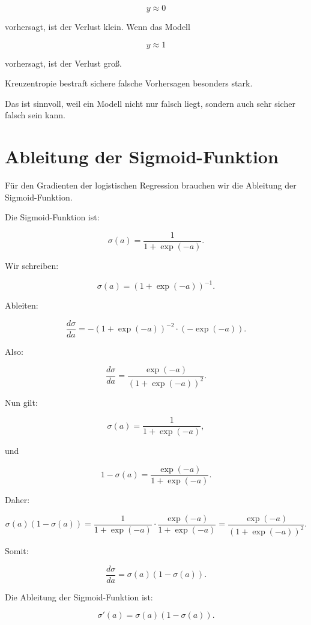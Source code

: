 \[
    y\approx 0
\]

vorhersagt, ist der Verlust klein.
Wenn das Modell

\[
    y\approx 1
\]

vorhersagt, ist der Verlust groß.

\begin{conceptbox}
Kreuzentropie bestraft sichere falsche Vorhersagen besonders stark.

Das ist sinnvoll, weil ein Modell nicht nur falsch liegt, sondern auch sehr sicher falsch sein kann.
\end{conceptbox}

\section{Ableitung der Sigmoid-Funktion}

Für den Gradienten der logistischen Regression brauchen wir die Ableitung der Sigmoid-Funktion.

Die Sigmoid-Funktion ist:

\[
    \sigma(a)
    =
    \frac{1}{1+\exp(-a)}.
\]

Wir schreiben:

\[
    \sigma(a)
    =
    (1+\exp(-a))^{-1}.
\]

Ableiten:

\[
    \frac{d\sigma}{da}
    =
    -(1+\exp(-a))^{-2}
    \cdot
    (-\exp(-a)).
\]

Also:

\[
    \frac{d\sigma}{da}
    =
    \frac{\exp(-a)}{(1+\exp(-a))^2}.
\]

Nun gilt:

\[
    \sigma(a)
    =
    \frac{1}{1+\exp(-a)},
\]

und

\[
    1-\sigma(a)
    =
    \frac{\exp(-a)}{1+\exp(-a)}.
\]

Daher:

\[
    \sigma(a)(1-\sigma(a))
    =
    \frac{1}{1+\exp(-a)}
    \cdot
    \frac{\exp(-a)}{1+\exp(-a)}
    =
    \frac{\exp(-a)}{(1+\exp(-a))^2}.
\]

Somit:

\[
    \frac{d\sigma}{da}
    =
    \sigma(a)(1-\sigma(a)).
\]

\begin{definitionbox}
Die Ableitung der Sigmoid-Funktion ist:

\[
    \sigma'(a)
    =
    \sigma(a)(1-\sigma(a)).
\]
\end{definitionbox}

